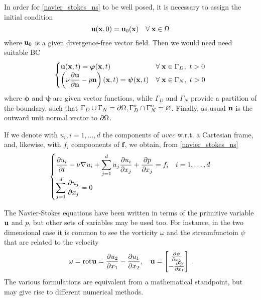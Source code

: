 In order for \eqref{navier_stokes_ns} to be well posed, it is necessary to assign the initial condition 
\begin{equation}
    \textbf{u}(\textbf{x}, 0) = \textbf{u}_0(\textbf{x}) \quad \forall \; \textbf{x} \in \Omega
    \label{initial_condition_ns}
\end{equation}
where \(\textbf{u}_0\) is a given divergence-free vector field. Then we would need need suitable BC
\begin{equation}
    \begin{cases}
        \uvec(\xvec, t) = \bm{\phi}(\xvec, t) & \forall \; \xvec \in \Gamma_D, \ t > 0 \\
        \displaystyle \left( \nu \partialderivative{\uvec}{\vect{n}} - p\normal  \right)\left( \xvec, t \right) = \bm{\psi}(\xvec, t) & \forall \; \xvec \in \Gamma_N, \ t > 0 
    \end{cases}
    \label{boundaries_ns}
\end{equation}
where \(\bm{\phi}\) and \(\bm{\psi}\) are given vector functions, while \(\Gamma_D\) and \(\Gamma_N\) provide a partition of the boundary, such that \(\Gamma_D \cup \Gamma_N = \partial\Omega, {\kern0pt\Gamma}^{\mathrm{o}}_D \cap {\kern0pt\Gamma}^{\mathrm{o}}_N =\varnothing\).
Finally, as usual \(\textbf{n}\) is the outward unit normal vector to \(\partial\Omega\).

If we denote with \(u_i, i = 1,\ldots, d\) the components of \(uvec\) w.r.t. a Cartesian frame, and, likewise, with \(f_i\) compoonents of \(\textbf{f}\), we obtain, from \eqref{navier_stokes_ns}
\[
    \begin{cases}
        \displaystyle \partialderivative{u_i}{t} - \nu \grad u_i + \sum_{j=1}^{d} u_j\partialderivative{u_i}{x_j} + \partialderivative{p}{x_j} = f_i & i = 1,\ldots, d \\
        \displaystyle \sum_{j=1}^{d} \partialderivative{u_j}{x_j} = 0
    \end{cases}
\]
\begin{remark}
    The Navier-Stokes equations have been written in terms of the primitive variable \(\textbf{u}\) and \(p\), but other sets of variables may be used too. For instance, in the two dimensional case it is common to see the vorticity \(\omega\) and the streamfunctoin \(\psi\) that are related to the velocity
    \begin{equation*}
        \omega =\rot\uvec = \partialderivative{u_2}{x_1} - \partialderivative{u_1}{x_2}, \quad \uvec = \left[ \begin{matrix*}
            \partialderivative{\psi}{x_2} \\
            -\partialderivative{\psi}{x_1}
        \end{matrix*} \right].
    \end{equation*}
    The various formulations are equivalent from a mathematical standpoint, but may give rise to different numerical methods.
\end{remark}
